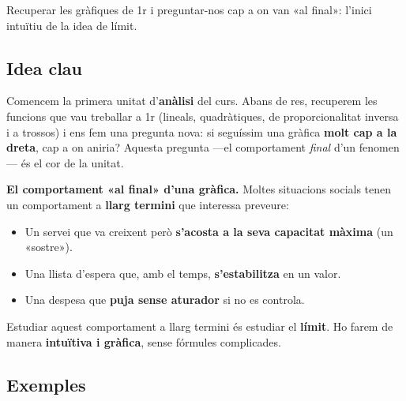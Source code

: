%
{Recuperar les gràfiques de 1r i preguntar-nos cap a on van «al final»: l'inici intuïtiu de la idea de límit.}

\subsection{Idea clau}

Comencem la primera unitat d'\textbf{anàlisi} del curs. Abans de res, recuperem les
funcions que vau treballar a 1r (lineals, quadràtiques, de proporcionalitat inversa i
a trossos) i ens fem una pregunta nova: si seguíssim una gràfica \textbf{molt cap a la
dreta}, cap a on aniria? Aquesta pregunta —el comportament \emph{final} d'un
fenomen— és el cor de la unitat.

\begin{idea}
\textbf{El comportament «al final» d'una gràfica.} Moltes situacions socials tenen un
comportament a \textbf{llarg termini} que interessa preveure:
\begin{itemize}[leftmargin=1.4em, itemsep=2pt]
  \item Un servei que va creixent però \textbf{s'acosta a la seva capacitat màxima}
        (un «sostre»).
  \item Una llista d'espera que, amb el temps, \textbf{s'estabilitza} en un valor.
  \item Una despesa que \textbf{puja sense aturador} si no es controla.
\end{itemize}
Estudiar aquest comportament a llarg termini és estudiar el \textbf{límit}. Ho farem
de manera \textbf{intuïtiva i gràfica}, sense fórmules complicades.
\end{idea}

\subsection{Exemples}

